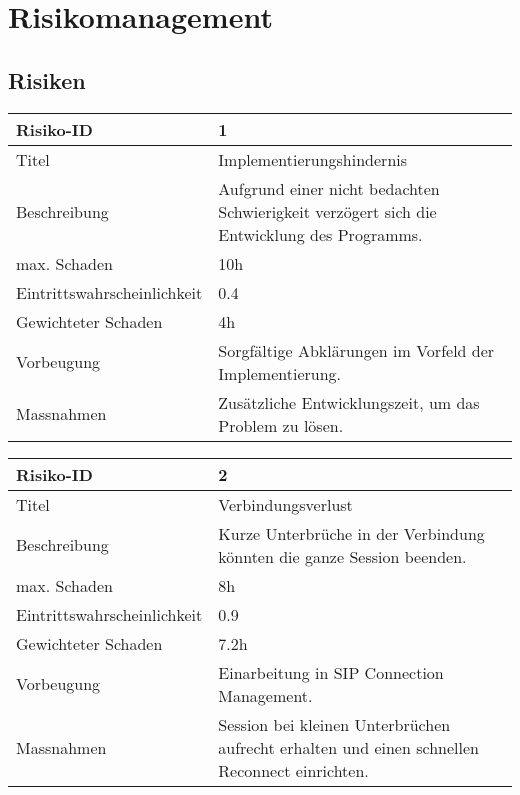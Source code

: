 \chapter{Risikomanagement}
\label{risiken} 
\section{Risiken}

\noindent
\begin{tabular}{|p{} | p{} |}
	\hline	
	Risiko-ID & 1 \\
	\hline
	Titel & Implementierungshindernis \\
	Beschreibung & Aufgrund einer nicht bedachten Schwierigkeit verzögert sich die
	Entwicklung des Programms. \\
	max. Schaden	& 10h \\
	Eintrittswahrscheinlichkeit & 0.4 \\
	Gewichteter Schaden	& 4h \\
	Vorbeugung	& Sorgfältige Abklärungen im Vorfeld der Implementierung. \\
	Massnahmen	& Zusätzliche Entwicklungszeit, um das Problem zu lösen. \\
	\hline
\end{tabular}
\hspace{0.5cm}
\newline

\noindent
\begin{tabular}{|p{} | p{} |}
	\hline	
	Risiko-ID & 2 \\
	\hline
	Titel & Verbindungsverlust \\
	Beschreibung & Kurze Unterbrüche in der Verbindung könnten die ganze Session
	beenden. \\
	max. Schaden	& 8h \\
	Eintrittswahrscheinlichkeit & 0.9 \\
	Gewichteter Schaden	& 7.2h \\
	Vorbeugung	& Einarbeitung in SIP Connection Management. \\
	Massnahmen	& Session bei kleinen Unterbrüchen aufrecht erhalten und einen
	schnellen Reconnect einrichten. \\
	\hline
\end{tabular}
\hspace{0.5cm}
\newline
	
